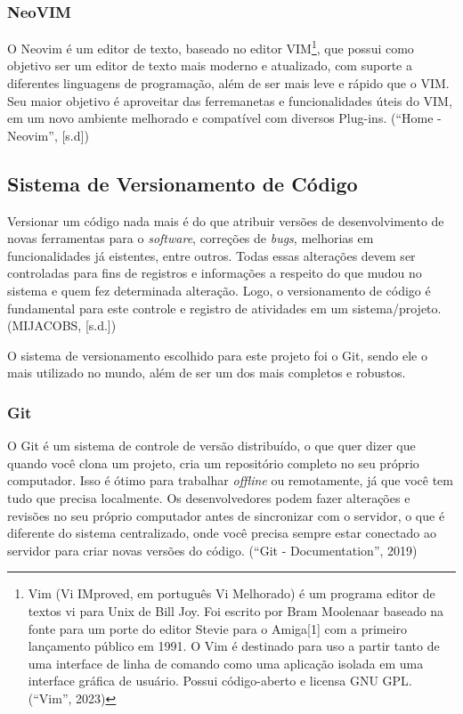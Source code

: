 \documentclass[a4paper,12pt]{article}
\begin{document}
\subsubsection{NeoVIM}
O Neovim é um editor de texto, baseado no editor VIM\footnote{
	Vim (Vi IMproved, em português Vi Melhorado) é um programa editor de textos vi para Unix de Bill Joy. Foi escrito por Bram Moolenaar baseado na fonte para um porte do editor 
	Stevie para o Amiga[1] com a primeiro lançamento público em 1991. O Vim é destinado para uso a partir tanto de uma interface de linha de comando como uma aplicação isolada em uma interface gráfica de usuário.
	Possui código-aberto e licensa GNU GPL. (“Vim”, 2023)
}, que possui como objetivo ser um editor de texto mais moderno e atualizado, com suporte a diferentes linguagens de programação, além de ser mais leve e rápido que o VIM.
Seu maior objetivo é aproveitar das ferremanetas e funcionalidades úteis do VIM, em um novo ambiente melhorado e 
compatível com diversos Plug-ins. (“Home - Neovim”, [s.d])


\subsection{Sistema de Versionamento de Código}
Versionar um código nada mais é do que atribuir versões de desenvolvimento de novas ferramentas para o \textit{software}, correções de \textit{bugs}, 
melhorias em funcionalidades já eistentes, entre outros. Todas essas alterações devem ser controladas para fins de registros e informações a respeito do que mudou 
no sistema e quem fez determinada alteração. Logo, o versionamento de código é fundamental para este controle e 
registro de atividades em um sistema/projeto. (MIJACOBS, [s.d.])

O sistema de versionamento escolhido para este projeto foi o Git, sendo ele o mais utilizado no mundo, além de ser um dos mais completos e robustos.


\subsubsection{Git}
O Git é um sistema de controle de versão distribuído, o que quer dizer que quando você clona um projeto, cria um repositório completo no seu próprio computador. 
Isso é ótimo para trabalhar \textit{offline} ou remotamente, já que você tem tudo que precisa localmente. Os desenvolvedores podem fazer alterações e revisões no seu próprio 
computador antes de sincronizar com o servidor, o que é diferente do sistema centralizado, onde você precisa sempre estar conectado ao servidor para criar 
novas versões do código.  (“Git - Documentation”, 2019)
\end{document}
